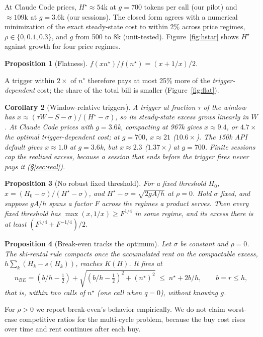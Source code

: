 \documentclass[11pt]{article}
\newtheorem{proposition}{Proposition}
\newtheorem{corollary}[proposition]{Corollary}
\begin{document}
At Claude Code prices, $H^\star\approx54$k at $g=700$ tokens per call (our pilot) and $\approx109$k at $g=3.6$k (our sessions). The closed form agrees with a numerical minimization of the exact steady-state cost to within 2\% across price regimes, $\rho\in\{0,0.1,0.3\}$, and $g$ from 500 to 8k (unit-tested). Figure~\ref{fig:hstar} shows $H^\star$ against growth for four price regimes.

\begin{proposition}[Flatness]\label{prop:flat}
$f(xn^\star)/f(n^\star)=(x+1/x)/2$.
\end{proposition}
A trigger within $2\times$ of $n^\star$ therefore pays at most 25\% more of the \emph{trigger-dependent} cost; the share of the total bill is smaller (Figure~\ref{fig:flat}).

\begin{corollary}[Window-relative triggers]\label{cor:window}
A trigger at fraction $\tau$ of the window has $x\approx(\tau W-S-\sigma)/(H^\star-\sigma)$, so its steady-state excess grows linearly in $W$. At Claude Code prices with $g=3.6$k, compacting at 967k gives $x\approx9.4$, or $4.7\times$ the optimal trigger-dependent cost; at $g=700$, $x\approx21$ ($10.6\times$). The 150k API default gives $x\approx1.0$ at $g=3.6$k, but $x\approx2.3$ ($1.37\times$) at $g=700$. Finite sessions cap the realized excess, because a session that ends before the trigger fires never pays it (\S\ref{sec:real}).
\end{corollary}

\begin{proposition}[No robust fixed threshold]\label{prop:robust}
For a fixed threshold $H_0$, $x=(H_0-\sigma)/(H^\star-\sigma)$, and $H^\star-\sigma=\sqrt{2gA/h}$ at $\rho=0$. Hold $\sigma$ fixed, and suppose $gA/h$ spans a factor $F$ across the regimes a product serves. Then every fixed threshold has $\max(x,1/x)\ge F^{1/4}$ in some regime, and its excess there is at least $(F^{1/4}+F^{-1/4})/2$.
\end{proposition}

\begin{proposition}[Break-even tracks the optimum]\label{prop:be}
Let $\sigma$ be constant and $\rho=0$. The ski-rental rule compacts once the accumulated rent on the compactable excess, $h\sum_k (H_k-s(H_k))$, reaches $K(H)$. It fires at
\[
n_{BE}=(b/h-\tfrac12)+\sqrt{(b/h-\tfrac12)^2+(n^\star)^2}\;\le\;n^\star+2b/h,\qquad b=r\le h,
\]
that is, within two calls of $n^\star$ (one call when $q=0$), without knowing $g$.
\end{proposition}
For $\rho>0$ we report break-even's behavior empirically. We do not claim worst-case competitive ratios for the multi-cycle problem, because the buy cost rises over time and rent continues after each buy.
\end{document}
